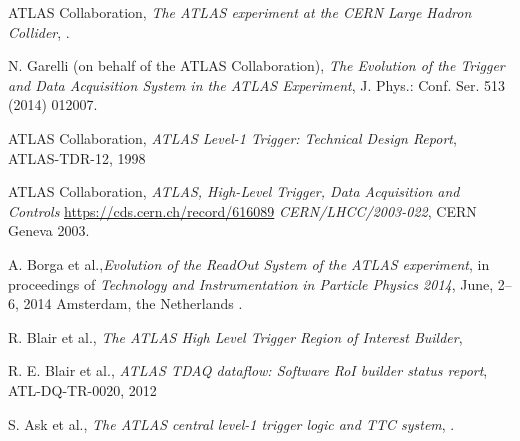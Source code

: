 \documentclass{JINST}
\begin{document}







\begin{thebibliography}{9}

ATLAS Collaboration, \emph{The ATLAS experiment at the CERN Large Hadron Collider}, .

 N. Garelli (on behalf of the ATLAS Collaboration),
\emph{The Evolution of the Trigger and Data
Acquisition System in the ATLAS Experiment},
{J. Phys.: Conf. Ser.
513 (2014) 012007.}



ATLAS Collaboration, \emph{ATLAS Level-1 Trigger: Technical Design Report}, 
{ATLAS-TDR-12}, 1998


ATLAS Collaboration,
\emph{ATLAS, High-Level Trigger, Data Acquisition and Controls} \href{https://cds.cern.ch/record/616089}{https://cds.cern.ch/record/616089}
\emph{CERN/LHCC/2003-022}, CERN Geneva 2003.






A. Borga et al.,\emph{Evolution of the ReadOut System of the ATLAS experiment}, in proceedings of
\emph{Technology and Instrumentation in Particle Physics 2014}, June, 2--6, 2014 Amsterdam, the Netherlands
.



R. Blair et al.,
\emph{The ATLAS High Level Trigger Region of Interest Builder},


R. E. Blair et al., \emph{ATLAS TDAQ dataflow: Software RoI builder status report}, {ATL-DQ-TR-0020}, 2012


S. Ask et al., \emph{The ATLAS central level-1 trigger logic and TTC system}, .





\end{thebibliography}
\end{document}
